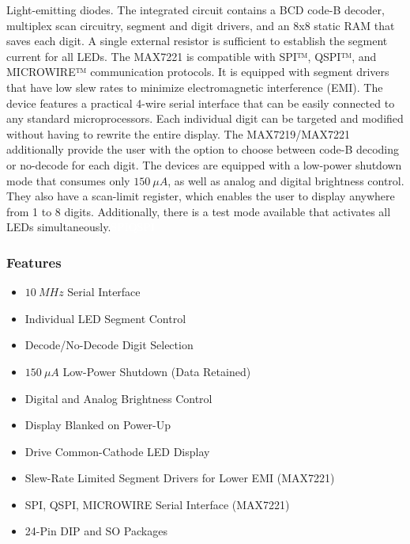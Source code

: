 Light-emitting diodes. The integrated circuit contains a BCD code-B decoder, multiplex scan circuitry, segment and digit drivers, and an 8x8 static RAM that saves each digit. A single external resistor is sufficient to establish the segment current for all LEDs. The MAX7221 is compatible with \gls{SPI}™, \gls{QSPI}™, and \gls{MICROWIRE}™ communication protocols. It is equipped with segment drivers that have low slew rates to minimize electromagnetic interference (EMI).
The device features a practical 4-wire serial interface that can be easily connected to any standard microprocessors. Each individual digit can be targeted and modified without having to rewrite the entire display. The MAX7219/MAX7221 additionally provide the user with the option to choose between code-B decoding or no-decode for each digit.
The devices are equipped with a low-power shutdown mode that consumes only $\SI{150}{\mu A}$, as well as analog and digital brightness control. They also have a scan-limit register, which enables the user to display anywhere from 1 to 8 digits. Additionally, there is a test mode available that activates all LEDs simultaneously.{\tiny \textcolor{white}{\ac{SPI}}}{\tiny \textcolor{white}{\ac{QSPI}}}
\subsubsection*{Features}
\begin{itemize}
    \item $\SI{10}{MHz}$ Serial Interface
    \item Individual LED Segment Control
    \item Decode/No-Decode Digit Selection
    \item $\SI{150}{\mu A}$ Low-Power Shutdown (Data Retained)
    \item Digital and Analog Brightness Control
    \item Display Blanked on Power-Up
    \item Drive Common-Cathode LED Display
    \item Slew-Rate Limited Segment Drivers
for Lower EMI (MAX7221)
    \item SPI, QSPI, MICROWIRE Serial Interface (MAX7221)
    \item 24-Pin DIP and SO Packages
\end{itemize}

